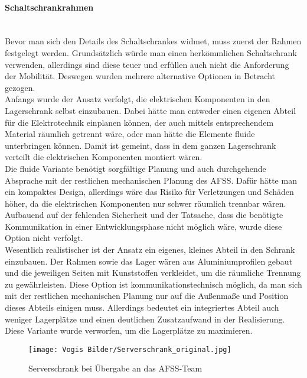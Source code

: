     \paragraph{Schaltschrankrahmen}\mbox{}\\
    Bevor man sich den Details des Schaltschrankes widmet, muss zuerst der Rahmen festgelegt werden. Grundsätzlich würde man einen herkömmlichen Schaltschrank verwenden, allerdings sind diese teuer und erfüllen auch nicht die Anforderung der Mobilität. Deswegen wurden mehrere alternative Optionen in Betracht gezogen.\\
    Anfangs wurde der Ansatz verfolgt, die elektrischen Komponenten in den Lagerschrank selbst einzubauen. Dabei hätte man entweder einen eigenen Abteil für die Elektrotechnik einplanen können, der auch mittels entsprechendem Material räumlich getrennt wäre, oder man hätte die Elemente fluide unterbringen können. Damit ist gemeint, dass in dem ganzen Lagerschrank verteilt die elektrischen Komponenten montiert wären.\\
    Die fluide Variante benötigt sorgfältige Planung und auch durchgehende Absprache mit der restlichen mechanischen Planung des AFSS. Dafür hätte man ein kompaktes Design, allerdings wäre das Risiko für Verletzungen und Schäden höher, da die elektrischen Komponenten nur schwer räumlich trennbar wären. Aufbauend auf der fehlenden Sicherheit und der Tatsache, dass die benötigte Kommunikation in einer Entwicklungsphase nicht möglich wäre, wurde diese Option nicht verfolgt.\\
    Wesentlich realistischer ist der Ansatz ein eigenes, kleines Abteil in den Schrank einzubauen. Der Rahmen sowie das Lager wären aus Aluminiumprofilen gebaut und die jeweiligen Seiten mit Kunststoffen verkleidet, um die räumliche Trennung zu gewährleisten. Diese Option ist kommunikationstechnisch möglich, da man sich mit der restlichen mechanischen Planung nur auf die Außenmaße und Position dieses Abteils einigen muss. Allerdings bedeutet ein integriertes Abteil auch weniger Lagerplätze und einen deutlichen Zusatzaufwand in der Realisierung. Diese Variante wurde verworfen, um die Lagerplätze zu maximieren.\\
    \begin{figure}[h]
        \centering
        \texttt{[image: Vogis Bilder/Serverschrank\_original.jpg]}
        \caption{Serverschrank bei Übergabe an das AFSS-Team}
        \label{fig:Serverschrank_original}
    \end{figure}\\
